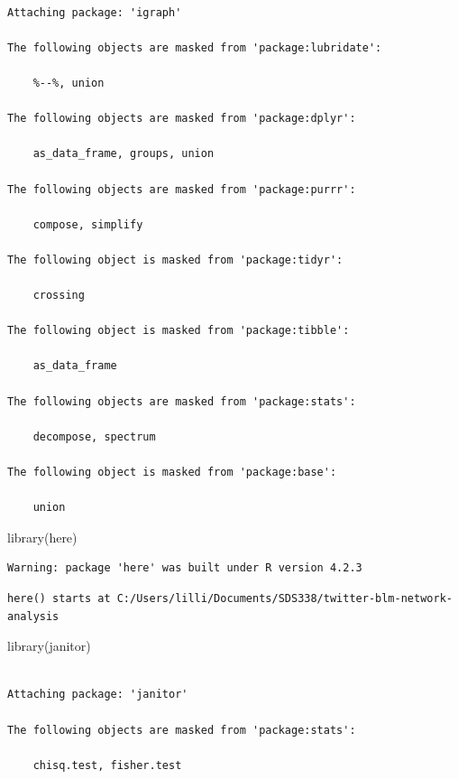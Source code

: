 \documentclass[
  letterpaper,
  DIV=11,
  numbers=noendperiod]{scrartcl}
\newenvironment{Shaded}{\begin{snugshade}}{\end{snugshade}}
\newcommand{\FunctionTok}[1]{\textcolor[rgb]{0.28,0.35,0.67}{#1}}
\newcommand{\NormalTok}[1]{\textcolor[rgb]{0.00,0.23,0.31}{#1}}
\begin{document}
\begin{verbatim}

Attaching package: 'igraph'

The following objects are masked from 'package:lubridate':

    %--%, union

The following objects are masked from 'package:dplyr':

    as_data_frame, groups, union

The following objects are masked from 'package:purrr':

    compose, simplify

The following object is masked from 'package:tidyr':

    crossing

The following object is masked from 'package:tibble':

    as_data_frame

The following objects are masked from 'package:stats':

    decompose, spectrum

The following object is masked from 'package:base':

    union
\end{verbatim}

\begin{Shaded}
\begin{Highlighting}[]
\FunctionTok{library}\NormalTok{(here)}
\end{Highlighting}
\end{Shaded}

\begin{verbatim}
Warning: package 'here' was built under R version 4.2.3
\end{verbatim}

\begin{verbatim}
here() starts at C:/Users/lilli/Documents/SDS338/twitter-blm-network-analysis
\end{verbatim}

\begin{Shaded}
\begin{Highlighting}[]
\FunctionTok{library}\NormalTok{(janitor)}
\end{Highlighting}
\end{Shaded}

\begin{verbatim}

Attaching package: 'janitor'

The following objects are masked from 'package:stats':

    chisq.test, fisher.test
\end{verbatim}
\end{document}

